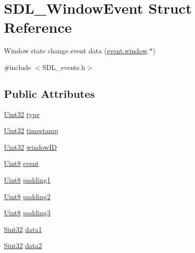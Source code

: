 \hypertarget{struct_s_d_l___window_event}{\section{S\-D\-L\-\_\-\-Window\-Event Struct Reference}
\label{struct_s_d_l___window_event}
}


Window state change event data (\hyperlink{union_s_d_l___event_a826936b3275406d857bc6654669fae71}{event.\-window}.$\ast$)  




{\ttfamily \#include $<$S\-D\-L\-\_\-events.\-h$>$}

\subsection*{Public Attributes}
\begin{DoxyCompactItemize}
\item 
\hyperlink{_s_d_l__stdinc_8h_add440eff171ea5f55cb00c4a9ab8672d}{Uint32} \hyperlink{struct_s_d_l___window_event_a01c8c8fbe8564e690f958d2db560f657}{type}
\item 
\hyperlink{_s_d_l__stdinc_8h_add440eff171ea5f55cb00c4a9ab8672d}{Uint32} \hyperlink{struct_s_d_l___window_event_a7b0bf569b20cfa4e3fb76e3301d616f9}{timestamp}
\item 
\hyperlink{_s_d_l__stdinc_8h_add440eff171ea5f55cb00c4a9ab8672d}{Uint32} \hyperlink{struct_s_d_l___window_event_a4b31796ffc84fbb7f6e9ba33e127619a}{window\-I\-D}
\item 
\hyperlink{_s_d_l__stdinc_8h_a2944638813a090aa23e62f4da842c3e2}{Uint8} \hyperlink{struct_s_d_l___window_event_a485cd1f07f0f22fdb9f4c4bf214011dc}{event}
\item 
\hyperlink{_s_d_l__stdinc_8h_a2944638813a090aa23e62f4da842c3e2}{Uint8} \hyperlink{struct_s_d_l___window_event_a09ee59114246eceed4a281033ec6609b}{padding1}
\item 
\hyperlink{_s_d_l__stdinc_8h_a2944638813a090aa23e62f4da842c3e2}{Uint8} \hyperlink{struct_s_d_l___window_event_a6bcf773b690b894e8c04c591826d0c8a}{padding2}
\item 
\hyperlink{_s_d_l__stdinc_8h_a2944638813a090aa23e62f4da842c3e2}{Uint8} \hyperlink{struct_s_d_l___window_event_ac352263b5fa4ba6dbd64a48062d5e29f}{padding3}
\item 
\hyperlink{_s_d_l__stdinc_8h_a7a90b941db9d4582e9ad7abb9940ff7e}{Sint32} \hyperlink{struct_s_d_l___window_event_a01da0025428d3434c80021f3e4089fec}{data1}
\item 
\hyperlink{_s_d_l__stdinc_8h_a7a90b941db9d4582e9ad7abb9940ff7e}{Sint32} \hyperlink{struct_s_d_l___window_event_af6cd0a21bc9ecadfee42f6a0147d7171}{data2}
\end{DoxyCompactItemize}



